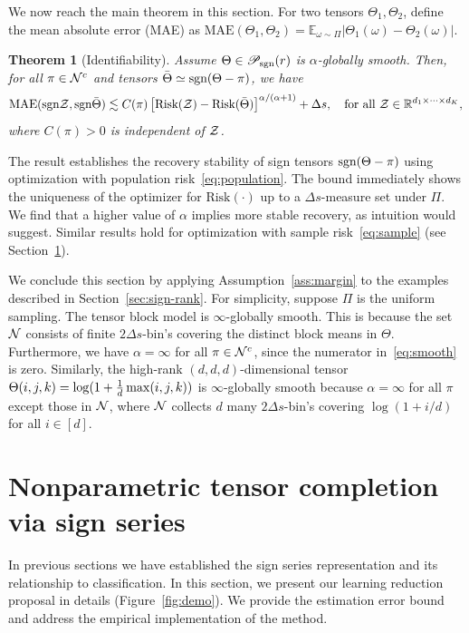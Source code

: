 \documentclass{article}
\theoremstyle{plain}
\newtheorem{thm}{Theorem}
\theoremstyle{definition}
\def\sign{\textup{sgn}}
\def\caliP{\mathscr{P}_{\textup{sgn}}}
\begin{document}
We now reach the main theorem in this section. For two tensors $\Theta_1,\Theta_2$, define the mean absolute error (MAE) as
$\text{MAE}(\Theta_1, \Theta_2)=\mathbb{E}_{\omega\sim \Pi}|\Theta_1(\omega)-\Theta_2(\omega)|.$

\vspace{.05cm}
\begin{thm}[Identifiability]\label{thm:population}Assume $\Theta\in\caliP(r)$ is $\alpha$-globally smooth. Then, for all $\pi\in \mathcal{N}^c$ and tensors $\bar \Theta \simeq \sign(\Theta-\pi)$, we have
\[
\textup{MAE}(\sign \tZ, \sign \bar \Theta) \lesssim C(\pi)\left[\textup{Risk}(\tZ)-\textup{Risk}( \bar \Theta)\right]^{\alpha/(\alpha+1)}+\Delta s, \quad \text{for all }\tZ\in\mathbb{R}^{d_1\times \cdots \times d_K},
\]
where $C(\pi)>0$ is independent of $\mathcal{Z}$. 
\end{thm}
The result establishes the recovery stability of sign tensors $\sign (\Theta-\pi)$ using optimization with population risk~\eqref{eq:population}. The bound immediately shows the uniqueness of the optimizer for $\text{Risk}(\cdot)$ up to a  $\Delta s$-measure set under $\Pi$. We find that a higher value of $\alpha$ implies more stable recovery, as intuition would suggest. Similar results hold for optimization with sample risk~\eqref{eq:sample} (see Section~\ref{sec:estimation}). 

We conclude this section by applying Assumption~\ref{ass:margin} to the examples described in Section~\ref{sec:sign-rank}. For simplicity, suppose $\Pi$ is the uniform sampling. 
The tensor block model is $\infty$-globally smooth. This is because the set $\mathcal{N}$ consists of finite $2\Delta s$-bin's covering the distinct block means in $\Theta$. Furthermore, we have $\alpha= \infty$ for all $\pi \in \mathcal{N}^c$, since the numerator in~\eqref{eq:smooth} is zero. Similarly, the high-rank $(d,d,d)$-dimensional tensor $\Theta(i,j,k) = \log(1+{1\over d}\max(i,j,k))$ is $\infty$-globally smooth because $\alpha=\infty$ for all $\pi$ except those in $\mathcal{N}$, where $\mathcal{N}$ collects $d$ many $2\Delta s$-bin's covering $\log(1+i/d)$ for all $i \in[d]$.


\section{Nonparametric tensor completion via sign series}\label{sec:estimation}

In previous sections we have established the sign series representation and its relationship to classification. In this section, we present our learning reduction proposal in details (Figure~\ref{fig:demo}). We provide the estimation error bound and address the empirical implementation of the method. 
\end{document}
